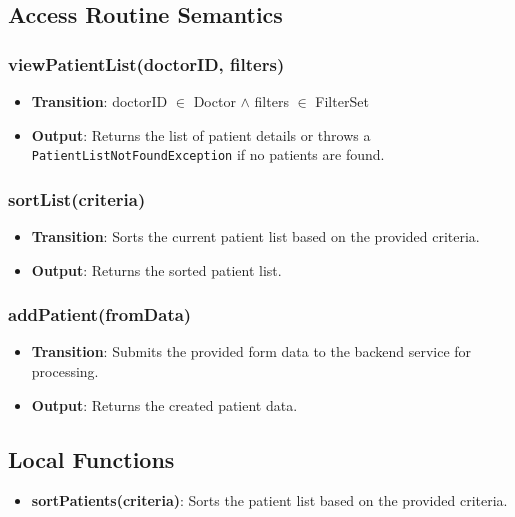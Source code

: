 \documentclass[12pt, titlepage]{article}
\begin{document}
\subsection{Access Routine Semantics}
\subsubsection{viewPatientList(doctorID, filters)}

\begin{itemize}
    \item \textbf{Transition}: doctorID $\in$ Doctor $\land$ filters $\in$ FilterSet
    \item \textbf{Output}: Returns the list of patient details or throws a \texttt{PatientListNotFoundException} if no patients are found.
\end{itemize}

\subsubsection{sortList(criteria)}

\begin{itemize}
    \item \textbf{Transition}: Sorts the current patient list based on the provided criteria.
    \item \textbf{Output}: Returns the sorted patient list.
\end{itemize}

\subsubsection{addPatient(fromData)}
\begin{itemize}
    \item \textbf{Transition}: Submits the provided form data to the backend service for processing.
    \item \textbf{Output}: Returns the created patient data.
\end{itemize}

\subsection{Local Functions}
\begin{itemize}
\item \textbf{sortPatients(criteria)}: Sorts the patient list based on the provided criteria.
\end{itemize}

\newpage
\end{document}
